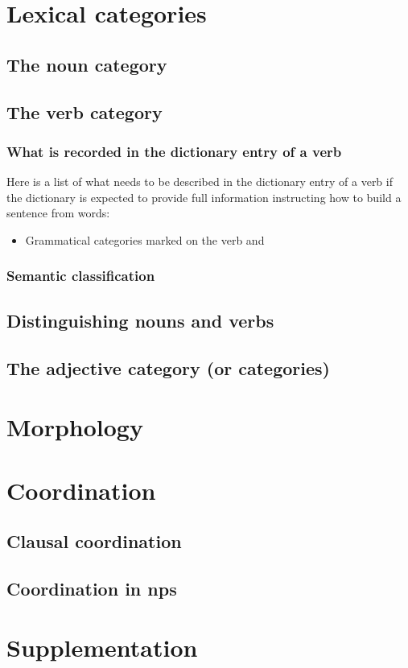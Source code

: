 \documentclass{article}
\begin{document}
\section{Lexical categories}

\subsection{The noun category}

\subsection{The verb category}

\subsubsection{What is recorded in the dictionary entry of a verb}

Here is a list of what needs to be described in the dictionary entry of a verb
if the dictionary is expected to provide full information instructing 
how to build a sentence from words:
\begin{itemize}
    \item Grammatical categories marked on the verb and 
\end{itemize}

\subsubsection{Semantic classification}

\subsection{Distinguishing nouns and verbs}

\subsection{The adjective category (or categories)}

\section{Morphology}

\section{Coordination}

\subsection{Clausal coordination}\label{sec:clause-coord}

\subsection{Coordination in \ac{np}s}

\section{Supplementation}\label{sec:clause-supp}



\end{document}
